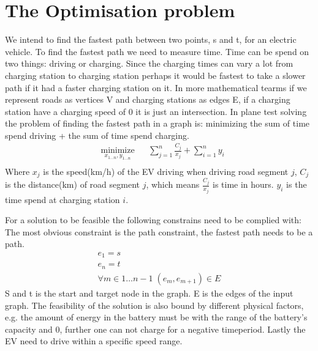 \section{The Optimisation problem}

We intend to find the fastest path between two points, s and t, for an electric vehicle. To find the fastest path we need to measure time. Time can be spend on two things: driving or charging. Since the charging times can vary a lot from charging station to charging station perhaps it would be fastest to take a slower path if it had a faster charging station on it. In more mathematical tearms if we represent roads as vertices V and charging stations as edges E, if a charging station have a charging speed of 0 it is just an intersection. In plane test solving the problem of finding the fastest path in a graph is: 
minimizing the sum of time spend driving + the sum of time spend charging. 
\begin{equation}
\begin{aligned}
& \underset{x_{1 \dots n},y_{1 \dots n}}{\text{minimize}}
& & \sum_{j=1}^{n} \frac{C_j}{x_j} + \sum_{i=1}^{n} y_i \\
\end{aligned}
\end{equation}\label{eq:objfunction}
Where $x_j$ is the speed(km/h) of the EV driving when driving road segment $j$, $C_j$ is the distance(km) of road segment $j$, which means $\frac{C_j}{x_j}$ is time in hours. $y_i$ is the time spend at charging station $i$.  

For a solution to be feasible the following constrains need to be complied with: 
The most obvious constraint is the path constraint, the fastest path needs to be a path. 
\begin{gather}
e_1 = s \\
e_n = t \\
\forall{m \in 1 \dots n-1} \; (e_m, e_{m+1}) \in E 
\end{gather}\label{eq:pathconstraint} 
S and  t is the start and target node in the graph. E is the edges of the input graph.  
The feasibility of the solution is also bound by different physical factors, e.g. the amount of energy in the battery must be with the range of the battery's capacity and 0, further one can not charge for a negative timeperiod. Lastly the EV need to drive within a specific speed range.     


